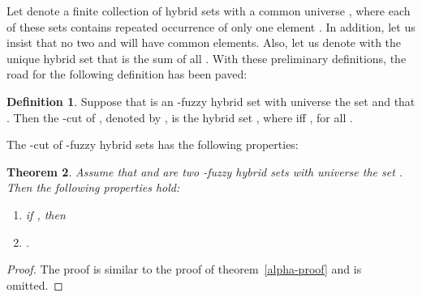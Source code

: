 \documentclass{amsart}
\newtheorem{theorem}{Theorem}[section]
\theoremstyle{definition}
\newtheorem{definition}[theorem]{Definition}
\begin{document}
Let  denote a finite collection of hybrid sets with a common universe
, where each of these sets contains repeated occurrence of only one element 
. In addition, let us insist that no two  and  will have common
elements. Also, let us denote with  the unique hybrid set that is the sum
of all . With these preliminary definitions, the road for the following definition 
has been paved:
\begin{definition}
Suppose that  is an 
-fuzzy hybrid set with universe the set  and that 
. Then the -cut of , denoted by
, is the hybrid set , where
 iff , for all
.
\end{definition}
The -cut of -fuzzy hybrid sets has the following properties:
\begin{theorem}
Assume that  and  are two -fuzzy hybrid sets 
with universe the set . Then the following properties hold:
\begin{enumerate}
\item if , then 

\item  .
\end{enumerate}
\end{theorem}
\begin{proof}
The proof is similar to the proof of theorem~\ref{alpha-proof} and is
omitted.
\end{proof}
\end{document}
